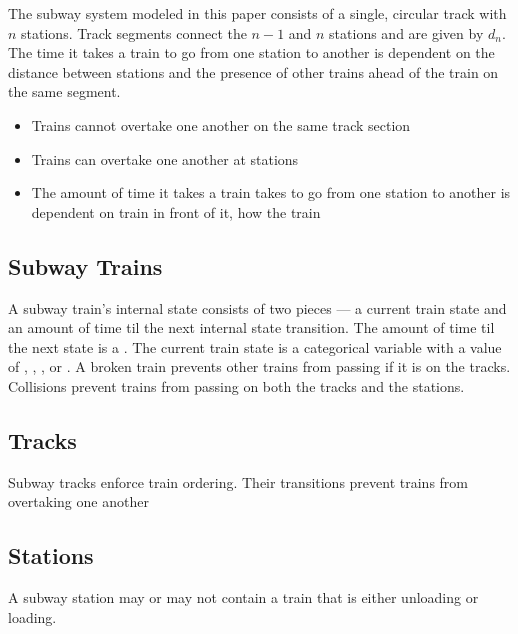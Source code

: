 The subway system modeled in this paper consists of a single, circular track
with \(n\) stations. Track segments connect the \(n-1\) and \(n\) stations and
are given by \(d_n\). The time it takes a train to go from one station to
another is dependent on the distance between stations and the presence of other
trains ahead of the train on the same segment.

\begin{itemize}
    \item Trains cannot overtake one another on the same track section
    \item Trains can overtake one another at stations
    \item The amount of time it takes a train takes to go from one station to
    another is dependent on train in front of it, how the train 
\end{itemize}

\subsection{Subway Trains}

A subway train's internal state consists of two pieces --- a current train state
and an amount of time til the next internal state transition. The amount of time
til the next state is a . The current train state is a categorical
variable with a value of , , ,
 or . A broken train prevents other trains
from passing if it is on the tracks. Collisions prevent trains from passing on
both the tracks and the stations.

\subsection{Tracks}

Subway tracks enforce train ordering. Their transitions prevent trains from
overtaking one another

\subsection{Stations}

A subway station may or may not contain a train that is either unloading or
loading.